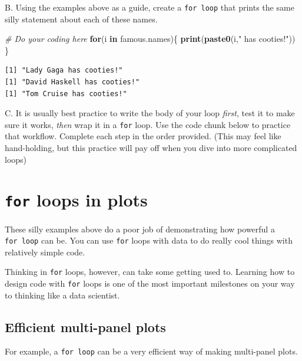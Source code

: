 \documentclass[
]{book}
\newenvironment{Shaded}{\begin{snugshade}}{\end{snugshade}}
\newcommand{\CommentTok}[1]{\textcolor[rgb]{0.56,0.35,0.01}{\textit{#1}}}
\newcommand{\ControlFlowTok}[1]{\textcolor[rgb]{0.13,0.29,0.53}{\textbf{#1}}}
\newcommand{\KeywordTok}[1]{\textcolor[rgb]{0.13,0.29,0.53}{\textbf{#1}}}
\newcommand{\NormalTok}[1]{#1}
\newcommand{\StringTok}[1]{\textcolor[rgb]{0.31,0.60,0.02}{#1}}
\begin{document}
B. Using the examples above as a guide, create a \texttt{for\ loop} that prints the same silly statement about each of these names.

\begin{Shaded}
\begin{Highlighting}[]
\CommentTok{# Do your coding here}
\ControlFlowTok{for}\NormalTok{(i }\ControlFlowTok{in}\NormalTok{ famous.names)\{}
  \KeywordTok{print}\NormalTok{(}\KeywordTok{paste0}\NormalTok{(i,}\StringTok{" has cooties!"}\NormalTok{))}
\NormalTok{\}}
\end{Highlighting}
\end{Shaded}

\begin{verbatim}
[1] "Lady Gaga has cooties!"
[1] "David Haskell has cooties!"
[1] "Tom Cruise has cooties!"
\end{verbatim}

C. It is usually best practice to write the body of your loop \emph{first}, test it to make sure it works, \emph{then} wrap it in a \texttt{for} loop. Use the code chunk below to practice that workflow. Complete each step in the order provided. (This may feel like hand-holding, but this practice will pay off when you dive into more complicated loops)

\hypertarget{for-loops-in-plots}{%
\section*{\texorpdfstring{\texttt{for} loops in plots}{for loops in plots}}\label{for-loops-in-plots}}

These silly examples above do a poor job of demonstrating how powerful a \texttt{for\ loop} can be. You can use \texttt{for} loops with data to do really cool things with relatively simple code.

Thinking in \texttt{for} loops, however, can take some getting used to. Learning how to design code with \texttt{for} loops is one of the most important milestones on your way to thinking like a data scientist.

\hypertarget{efficient-multi-panel-plots}{%
\subsection*{Efficient multi-panel plots}\label{efficient-multi-panel-plots}}

For example, a \texttt{for\ loop} can be a very efficient way of making multi-panel plots.
\end{document}
